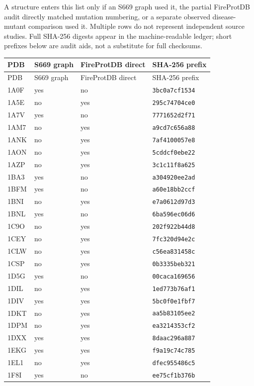 \documentclass[11pt]{article}
\begin{document}
A structure enters this list only if an S669 graph used it, the partial FireProtDB audit directly matched mutation numbering, or a separate observed disease-mutant comparison used it. Multiple rows do not represent independent source studies. Full SHA-256 digests appear in the machine-readable ledger; short prefixes below are audit aids, not a substitute for full checksums.
\begin{longtable}{llll}\hline PDB & S669 graph & FireProtDB direct & SHA-256 prefix\\\hline\endfirsthead\hline PDB & S669 graph & FireProtDB direct & SHA-256 prefix\\\hline\endhead
1A0F & yes & no & \texttt{3bc0a7cf1534}\\
1A5E & no & yes & \texttt{295c74704ce0}\\
1A7V & yes & no & \texttt{7771652d2f71}\\
1AM7 & no & yes & \texttt{a9cd7c656a88}\\
1ANK & no & yes & \texttt{7af4100057e8}\\
1AON & no & yes & \texttt{5cddcf0ebe22}\\
1AZP & no & yes & \texttt{3c1c11f8a625}\\
1BA3 & yes & no & \texttt{a304920ee2ad}\\
1BFM & yes & no & \texttt{a60e18bb2ccf}\\
1BNI & no & yes & \texttt{e7a0612d97d3}\\
1BNL & yes & no & \texttt{6ba596ec06d6}\\
1C9O & no & yes & \texttt{202f922b44d8}\\
1CEY & no & yes & \texttt{7fc320d94e2c}\\
1CLW & no & yes & \texttt{c56ea831458c}\\
1CSP & no & yes & \texttt{0b3335beb321}\\
1D5G & yes & no & \texttt{00caca169656}\\
1DIL & no & yes & \texttt{1ed773b76af1}\\
1DIV & yes & yes & \texttt{5bc0f0e1fbf7}\\
1DKT & no & yes & \texttt{aa5b83105ee2}\\
1DPM & no & yes & \texttt{ea3214353cf2}\\
1DXX & yes & yes & \texttt{8daac296a887}\\
1EKG & yes & yes & \texttt{f9a19c74c785}\\
1EL1 & no & yes & \texttt{dfec955486c5}\\
1F8I & yes & no & \texttt{ee75cf1b376b}\\

\end{longtable}
\end{document}
